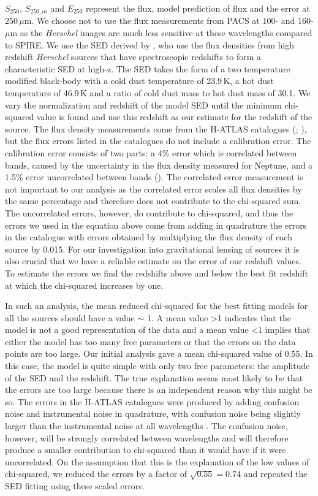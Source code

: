 \documentclass[fleqn,usenatbib]{mnras}
\begin{document}
$S_{250}$, $S_{250,m}$ and $E_{250}$ represent the flux, model prediction of flux and the error at 250\,$\mu$m. We choose not to use the flux measurements from PACS at 100- and 160-$\mu$m as the \textit{Herschel} images are much less sensitive at these wavelengths compared to SPIRE. We use the SED derived by \citealt{Pearson_2013}, who use the flux densities from high redshift \textit{Herschel} sources that have spectroscopic redshifts to form a characteristic SED at high-z. The SED takes the form of a two temperature modified black-body with a cold dust temperature of 23.9\,K, a hot dust temperature of 46.9\,K and a ratio of cold dust mass to hot dust mass of 30.1. We vary the normalization and redshift of the model SED until the minimum chi-squared value is found and use this redshift as our estimate for the redshift of the source. The flux density measurements come from the H-ATLAS catalogues (\citealt{Valiante_2016}; \citealt{Maddox_2018}), but the flux errors listed in the catalogues do not include a calibration error. The calibration error consists of two parts: a 4\% error which is correlated between bands, caused by the uncertainty in the flux density measured for Neptune, and a 1.5\% error uncorrelated between bands (\citealt{Valiante_2016}). The correlated error measurement is not important to our analysis as the correlated error scales all flux densities by the same percentage and therefore does not contribute to the chi-squared sum.  The uncorrelated errors, however, do contribute to chi-squared, and thus the errors we used in the equation above come from adding in quadrature the errors in the catalogue with errors obtained by multiplying the flux density of each source by 0.015. For our investigation into gravitational lensing of sources it is also crucial that we have a reliable estimate on the error of our redshift values. To estimate the errors we find the redshifts above and below the best fit redshift at which the chi-squared increases by one. 

In such an analysis, the mean reduced chi-squared for the best fitting models for all the sources should have a value $\sim$ 1. A mean value >1 indicates that the model is not a good representation of the data and a mean value <1 implies that either the model has too many free parameters or that the errors on the data points are too large. Our initial analysis gave a mean chi-squared value of 0.55. In this case, the model is quite simple with only two free parameters: the amplitude of the SED and the redshift. The true explanation seems most likely to be that the errors are too large because there is an independent reason why this might be so. The errors in the H-ATLAS catalogues were produced by adding confusion noise and instrumental noise in quadrature, with confusion noise being slightly larger than the instrumental noise at all wavelengths \citep{Valiante_2016}. The confusion noise, however, will be strongly correlated between wavelengths and will therefore produce a smaller contribution to chi-squared than it would have if it were uncorrelated. On the assumption that this is the explanation of the low values of chi-squared, we reduced the errors by a factor of $\sqrt{0.55} = 0.74$ and repeated the SED fitting using these scaled errors.
\end{document}
